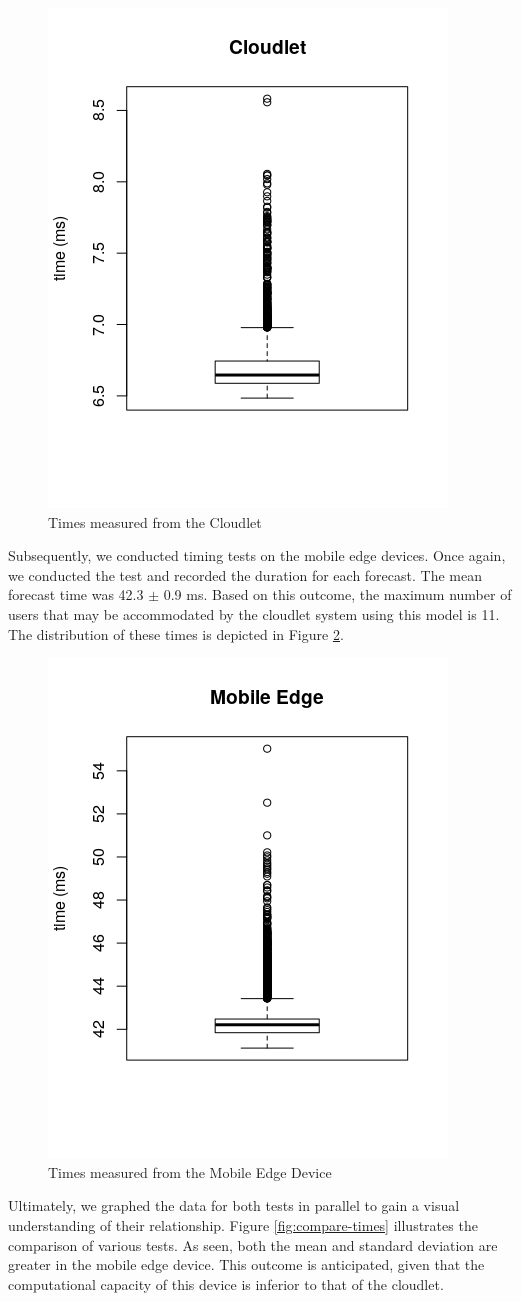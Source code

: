 \begin{figure}[h!]
    \centering
    \includegraphics[width=.4\linewidth]{Figures/cloudlet-times.png}
    \caption{Times measured from the Cloudlet}
    \label{fig:cloudlet-times}
\end{figure}

Subsequently, we conducted timing tests on the mobile edge devices. Once again, we conducted the test and recorded the duration for each forecast. The mean forecast time was 42.3 $\pm$ 0.9 ms. Based on this outcome, the maximum number of users that may be accommodated by the cloudlet system using this model is 11. The distribution of these times is depicted in Figure \ref{fig:medge-times}.

\begin{figure}[h!]
    \centering
    \includegraphics[width=.4\linewidth]{Figures/mobileedge-times.png}
    \caption{Times measured from the Mobile Edge Device}
    \label{fig:medge-times}
\end{figure}

Ultimately, we graphed the data for both tests in parallel to gain a visual understanding of their relationship. Figure \ref{fig:compare-times} illustrates the comparison of various tests. As seen, both the mean and standard deviation are greater in the mobile edge device. This outcome is anticipated, given that the computational capacity of this device is inferior to that of the cloudlet.

